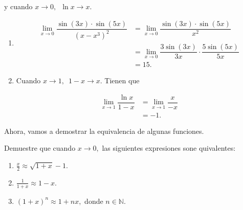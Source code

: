 y cuando \(x\to 0,\) \(\,\ln x\to x.\)\newline


\begin{example}
	\begin{enumerate}
		\item \begin{align*}
		\lim\limits_{x\to 0}\dfrac{\sin(3x)\cdot\sin(5x)}{(x-x^3)^2}&=\lim\limits_{x\to 0}\dfrac{\sin(3x)\cdot\sin(5x)}{x^2}\\
		&=\lim\limits_{x\to 0}\dfrac{3\sin(3x)}{3x}\cdot\dfrac{5\sin(5x)}{5x}\\
		&=15.
		\end{align*}
		
		\item Cuando \(x\to 1,\) \(\,1-x\to x.\) Tienen que
		
		 \begin{align*}
		\lim\limits_{x\to 1}\dfrac{\ln x}{1-x}&=\lim\limits_{x\to 1}\dfrac{x}{-x}\\
		&=-1.
		\end{align*}
	\end{enumerate}
\end{example}

Ahora, vamos a demostrar la equivalencia de algunas funciones.\newline

\begin{exercise}
	Demuestre que cuando \(x\to 0,\) las siguientes expresiones sone quivalentes:
	\begin{enumerate}
		\item \(\frac{x}{2}\approx\sqrt{1+x}-1.\)
		\item \(\frac{1}{1+x}\approx 1-x.\)
		\item \((1+x)^n\approx 1+nx,\) donde \(n\in\mathbb{N}.\)
	\end{enumerate}
\end{exercise}


